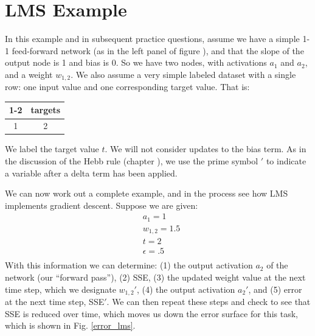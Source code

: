 
\section{LMS Example}\label{lms_example}

In this example and in subsequent practice questions, assume we have a  simple 1-1 feed-forward network  (as in the left panel of figure ), and that the slope of the output node is 1 and bias is 0. So we have two nodes, with activations $a_1$ and $a_2$, and a weight $w_{1,2}$. We also assume a very simple labeled dataset with a single row: one input value and one corresponding target value. That is:
\begin{center}
\begin{tabular}{| c || c | }
\cline{1-2}
\multicolumn{1}{| c || }{inputs}
 & \multicolumn{1}{c|}{targets} \\
\hline
  1 & 2  \\
\hline
\end{tabular}
\end{center}
We label the target value $t$. We will not consider updates to the bias term. As in the discussion of the Hebb rule (chapter ), we use the prime symbol $'$ to indicate a variable after a delta term has been applied.

We can now work out a complete example, and in the process see how LMS implements gradient descent. Suppose we are given:
\begin{eqnarray*}
& a_1 = 1 \\
& w_{1,2} = 1.5 \\
& t = 2  \\
& \epsilon = .5  \\
\end{eqnarray*}
With this information we can determine: (1) the output activation $a_2$ of the network (our ``forward pass''), (2) SSE, (3) the updated weight value at the next time step, which we designate $w_{1,2}'$, (4) the output activation $a_2'$, and (5) error at the next time step, SSE$'$. We can then repeat these steps and check to see that SSE is reduced over time, which moves us down the error surface for this task, which is shown in Fig. \ref{error_lms}.

